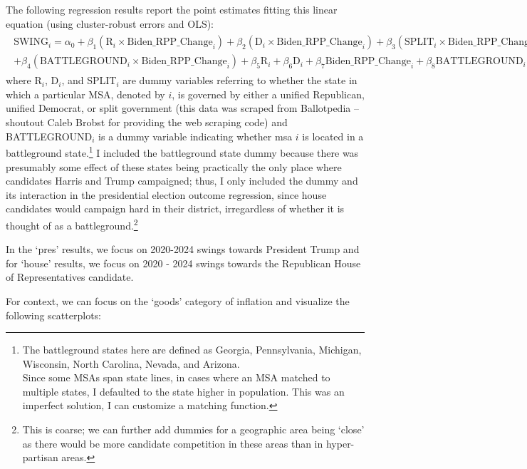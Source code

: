 \documentclass{article}
\begin{document}
The following regression results report the point estimates fitting this linear equation (using cluster-robust errors and OLS):
\begin{gather}
\begin{split}
	\text{SWING}_i = \alpha_0 + \beta_1 (\text{R}_i \times \text{Biden\_RPP\_Change}_i) + \beta_2 (\text{D}_i \times \text{Biden\_RPP\_Change}_i) + \beta_3 (\text{SPLIT}_i \times \text{Biden\_RPP\_Change}_i)  \\
	+ \beta_4 (\text{BATTLEGROUND}_i \times \text{Biden\_RPP\_Change}_i) + \beta_5 \text{R}_i + \beta_6 \text{D}_i + \beta_7 \text{Biden\_RPP\_Change}_i + \beta_8 \text{BATTLEGROUND}_i + \epsilon_i
\end{split}
\end{gather}
where R$_i$, D$_i$, and SPLIT$_i$ are dummy variables referring to whether the state in which a particular MSA, denoted by $i$, is governed by either a unified Republican, unified Democrat, or split government (this data was scraped from Ballotpedia -- shoutout Caleb Brobst for providing the web scraping code) and BATTLEGROUND$_i$ is a dummy variable indicating whether msa $i$ is located in a battleground state.\footnote{The battleground states here are defined as Georgia, Pennsylvania, Michigan, Wisconsin, North Carolina, Nevada, and Arizona. \\ Since some MSAs span state lines, in cases where an MSA matched to multiple states, I defaulted to the state higher in population. This was an imperfect solution, I can customize a matching function.} I included the battleground state dummy because there was presumably some effect of these states being practically the only place where candidates Harris and Trump campaigned; thus, I only included the dummy and its interaction in the presidential election outcome regression, since house candidates would campaign hard in their district, irregardless of whether it is thought of as a battleground.\footnote{This is coarse; we can further add dummies for a geographic area being `close' as there would be more candidate competition in these areas than in hyper-partisan areas.}

In the `pres' results, we focus on 2020-2024 swings towards President Trump and for `house' results, we focus on 2020 - 2024 swings towards the Republican House of Representatives candidate. 





For context, we can focus on the `goods' category of inflation and visualize the following scatterplots:
\end{document}
